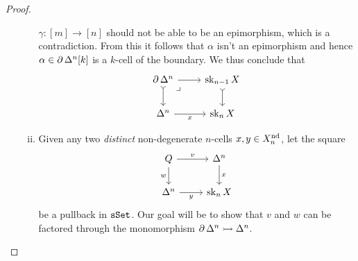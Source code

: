 \begin{proof}
\begin{itemize}
\begin{enumerate}[(i)]
                        \(\gamma: [m] \to [n]\) should not be able to be an epimorphism, which is a
                        contradiction.  From this it follows that \(\alpha\) isn't an epimorphism and
                        hence \(\alpha \in \operatorname{\partial} \Delta^n[k]\) is a \(k\)-cell of the boundary. We thus
                        conclude that
                        \[
                            \begin{tikzcd}
                                \Bd \splx^n
                                \ar[rd, phantom, "\lrcorner", very near start]
                                \ar[r] \ar[d, tail]
                                &\Sk_{n-1} X \ar[d, tail]
                                \\
                                \splx^n \ar[r, "x"']
                                &\Sk_n X
                            \end{tikzcd}
                        \]


                  \item Given any two \emph{distinct} non-degenerate \(n\)-cells \(x, y \in
                        X_n^{\operatorname{nd}}\), let the square
                        \[
                            \begin{tikzcd}
                                Q \ar[r, "v"]
                                \ar[d, "w"']
                                &\splx^n \ar[d, "x"] \\
                                \splx^n \ar[r, "y"']
                                &\Sk_n X
                            \end{tikzcd}
                        \]
                        be a pullback in \({\texttt{sSet}}\). Our goal will be to show that \(v\) and \(w\) can
                        be factored through the monomorphism \(\operatorname{\partial} \Delta^n \rightarrowtail \Delta^n\).


\end{enumerate}
\end{itemize}
\end{proof}
